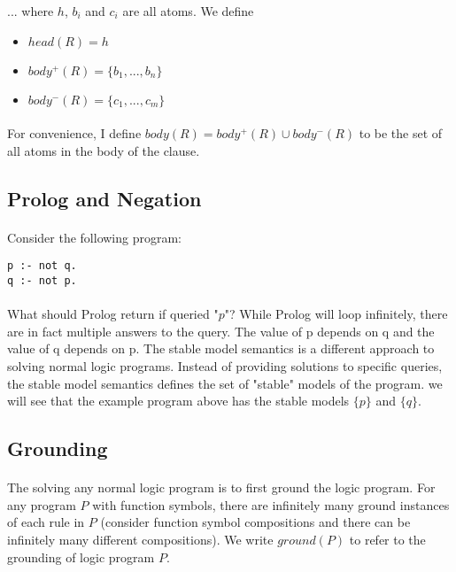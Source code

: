 \documentclass{article}
\theoremstyle{plain}
\theoremstyle{definition}
\begin{document}
\begin{multicols}{2}
\noindent ... where $h$, $b_i$ and $c_i$ are all atoms. We define 

\begin{itemize}
\item $head(R) = h$
\item $body^+(R) = \{ b_1, ..., b_n \}$
\item $body^-(R) = \{ c_1, ..., c_m \}$
\end{itemize}

\paragraph{} For convenience, I define $body(R) = body^+(R) \cup body^-(R)$ to be the set of all atoms in the body of the clause.

\subsection{Prolog and Negation}

\paragraph{} Consider the following program:

\begin{lstlisting}
p :- not q.
q :- not p.
\end{lstlisting}

\paragraph{} What should Prolog return if queried "$p$"? While Prolog will loop infinitely, there are in fact multiple answers to the query. The value of p depends on q and the value of q depends on p. The stable model semantics\cite{gelfond88} is a different approach to solving normal logic programs. Instead of providing solutions to specific queries, the stable model semantics defines the set of "stable" models of the program. we will see that the example program above has the stable models $\{p\}$ and $\{q\}$.

\subsection{Grounding}

\paragraph{} The solving any normal logic program is to first ground the logic program. For any program $P$ with function symbols, there are infinitely many ground instances of each rule in $P$ (consider function symbol compositions and there can be infinitely many different compositions). We write $ground(P)$ to refer to the grounding of logic program $P$.


\end{multicols}
\end{document}
